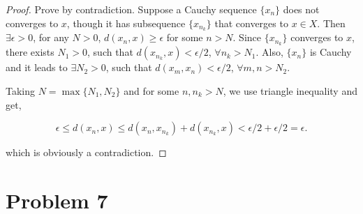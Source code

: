 \documentclass[12pt]{article}
\begin{document}
\begin{proof}

Prove by contradiction. Suppose a Cauchy sequence $\{x_n\}$ does not converges to $x$, though it has subsequence $\{x_{n_k}\}$ that converges to $x\in X$. Then $\exists \epsilon > 0$, for any $N > 0$, $d(x_n, x) \geqslant \epsilon$ for some $n > N$. Since $\{x_{n_k}\}$ converges to $x$, there exists $N_1 > 0$, such that $d(x_{n_k}, x) < \epsilon/2$, $\forall n_k > N_1$. Also, $\{x_n\}$ is Cauchy and it leads to $\exists N_2 > 0$, such that $d(x_m, x_n) <\epsilon/2$, $\forall m, n > N_2$. 

Taking $N = \max\{N_1, N_2\}$ and for some $n, n_k > N$, we use triangle inequality and get,

$$
\epsilon \leqslant d(x_n, x) \leqslant d(x_n, x_{n_k}) + d(x_{n_k}, x) < \epsilon/2 + \epsilon/2 = \epsilon.
$$

which is obviously a contradiction.

\end{proof}


\section*{Problem 7}
\end{document}
